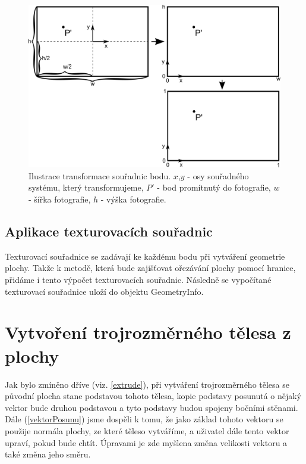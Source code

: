 \documentclass[11pt,twoside,a4paper]{book}
\begin{document}
\begin{figure}[h]
	\begin{center}
		\includegraphics[width=13cm]{ilustrace/Il-8-1}
		\caption{Ilustrace transformace souřadnic bodu. $x$,$y$ - osy souřadného systému, který transformujeme, $P'$ - bod promítnutý do fotografie, $w$ - šířka fotografie, $h$ - výška fotografie.}
		\label{fig:8-1}
	\end{center}
\end{figure}

\subsection{Aplikace texturovacích souřadnic}
Texturovací souřadnice se zadávají ke každému bodu při vytváření geometrie plochy. Takže k metodě, která bude zajišťovat ořezávání plochy pomocí hranice, přidáme i tento výpočet texturovacích souřadnic.  Následně se vypočítané texturovací souřadnice uloží do objektu GeometryInfo.

\section{Vytvoření trojrozměrného tělesa z plochy}
\label{navrhEnd}
Jak bylo zmíněno dříve (viz. \ref{extrude}), při vytváření trojrozměrného tělesa se původní plocha stane podstavou tohoto tělesa, kopie podstavy posunutá o nějaký vektor bude druhou podstavou a tyto podstavy budou spojeny bočními stěnami. Dále (\ref{vektorPosunu}) jsme dospěli k tomu, že jako základ tohoto vektoru se použije normála plochy, ze které těleso vytváříme, a uživatel dále tento vektor upraví, pokud bude chtít. Úpravami je zde myšlena změna velikosti vektoru a také změna jeho směru.  
\end{document}
